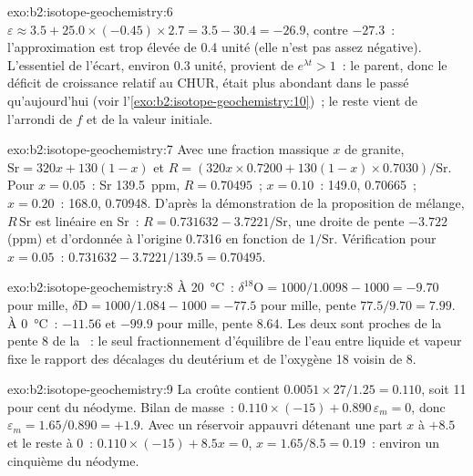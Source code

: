 \begin{solution}{exo:b2:isotope-geochemistry:6}
$\varepsilon \approx 3.5 + 25.0\times(-0.45)\times2.7 = 3.5 - 30.4 = -26.9$, contre
$-27.3$~: l'approximation est trop élevée de 0.4 unité (elle n'est pas assez négative). L'essentiel de
l'écart, environ 0.3 unité, provient de $e^{\lambda t} > 1$~: le parent, donc le
déficit de croissance relatif au CHUR, était plus abondant dans le passé qu'aujourd'hui
(voir l'\cref{exo:b2:isotope-geochemistry:10})~; le reste vient de l'arrondi de $f$ et de la valeur initiale.
\end{solution}

\begin{solution}{exo:b2:isotope-geochemistry:7}
Avec une fraction massique $x$ de granite, $\mathrm{Sr} = 320x + 130(1-x)$ et
$R = (320x\times0.7200 + 130(1-x)\times0.7030)/\mathrm{Sr}$. Pour $x = 0.05$~: Sr
\qty{139.5}{ppm}, $R = 0.70495$~; $x = 0.10$~: 149.0, 0.70665~; $x = 0.20$~: 168.0,
0.70948. D'après la démonstration de la proposition de mélange, $R\,\mathrm{Sr}$ est linéaire en Sr~:
$R = 0.731632 - 3.7221/\mathrm{Sr}$, une droite de pente $-3.722$ (ppm) et
d'ordonnée à l'origine 0.7316 en fonction de $1/\mathrm{Sr}$. Vérification pour $x = 0.05$~: $0.731632 - 3.7221/139.5
= 0.70495$.
\end{solution}

\begin{solution}{exo:b2:isotope-geochemistry:8}
À \qty{20}{\degreeCelsius}~: $\delta^{18}\mathrm{O} = 1000/1.0098 - 1000 = -9.70$ pour
mille, $\delta\mathrm{D} = 1000/1.084 - 1000 = -77.5$ pour mille, pente $77.5/9.70 = 7.99$.
À \qty{0}{\degreeCelsius}~: $-11.56$ et $-99.9$ pour mille, pente 8.64. Les deux sont proches de
la pente 8 de la ~: le seul fractionnement d'équilibre de l'eau
entre liquide et vapeur fixe le rapport des décalages du deutérium et de l'oxygène 18
voisin de 8.
\end{solution}

\begin{solution}{exo:b2:isotope-geochemistry:9}
La croûte contient $0.0051\times27/1.25 = 0.110$, soit 11 pour cent du néodyme. Bilan de
masse~: $0.110\times(-15) + 0.890\,\varepsilon_m = 0$, donc $\varepsilon_m = 1.65/0.890 =
+1.9$. Avec un réservoir appauvri détenant une part $x$ à $+8.5$ et le reste à 0~:
$0.110\times(-15) + 8.5x = 0$, $x = 1.65/8.5 = 0.19$~: environ un cinquième du
néodyme.
\end{solution}

